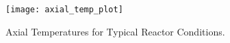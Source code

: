     \begin{figure}
      \centering
      \texttt{[image: axial\_temp\_plot]}
      \caption{Axial Temperatures for Typical Reactor Conditions.}
      \label{fig:axial_temp_plot}
    \end{figure}

